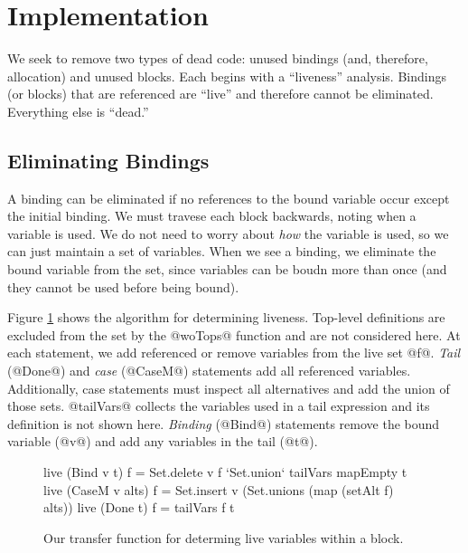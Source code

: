 \documentclass[12pt]{report}
\begin{document}


\section{Implementation}
We seek to remove two types of dead code: unused bindings (and,
therefore, allocation) and unused blocks. Each begins with a
``liveness'' analysis. Bindings (or blocks) that are referenced are ``live''
and therefore cannot be eliminated. Everything else is ``dead.'' 

\subsection{Eliminating Bindings}

A binding can be eliminated if no references to the bound variable
occur except the initial binding. We must travese each block backwards, noting when
a variable is used. We do not need to worry about \emph{how} the variable is used, so
we can just maintain a set of variables. When we see a binding, we eliminate the bound
variable from the set, since variables can be boudn more than once (and they cannot be used before being bound). 


Figure \ref{ref_fig_liveTransfer} shows the algorithm for determining
liveness.  Top-level definitions are excluded from the set by the
@woTops@ function and are not considered here. 
At each statement, we add referenced or remove variables from
the live set @f@. \emph{Tail} (@Done@) and \emph{case} (@CaseM@)
statements add all referenced variables. Additionally, case statements
must inspect all alternatives and add the union of those
sets. @tailVars@ collects the variables used in a tail expression and
its definition is not shown here. \emph{Binding} (@Bind@) statements
remove the bound variable (@v@) and add any variables in the tail
(@t@).

\begin{figure}[h]
\begin{code}
live (Bind v t) f = Set.delete v f  `Set.union` tailVars mapEmpty t
live (CaseM v alts) f = Set.insert v (Set.unions (map (setAlt f) alts))
live (Done t) f = tailVars f t
\end{code}
\caption{Our transfer function for determing live variables within a block.}
\label{ref_fig_liveTransfer}
\end{figure}
\end{document}
